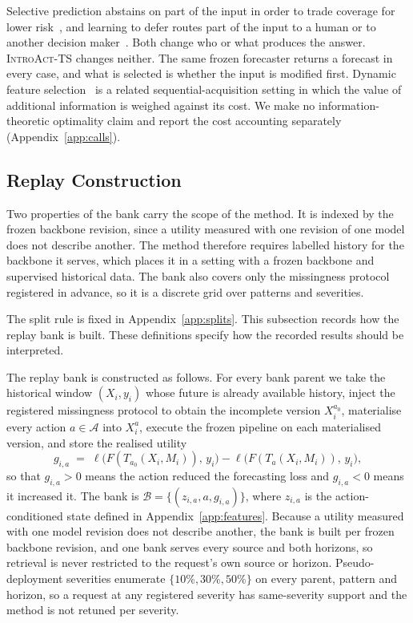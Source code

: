 \documentclass{article}
\newcommand{\introact}{\textsc{IntroAct-TS}}
\newcommand{\calA}{\mathcal{A}}
\newcommand{\calB}{\mathcal{B}}
\newcommand{\loss}{\ell}
\begin{document}
Selective prediction abstains on part of the input in order to trade coverage for lower
risk~\citep{chow1970optimum,vovk2005algorithmic,geifman2017selective,lei2018distribution}, and
learning to defer routes part of the input to a human or to another decision
maker~\citep{madras2018predict,mozannar2020consistent}. Both change who or what produces the
answer. \introact{} changes neither. The same frozen forecaster returns a forecast in every
case, and what is selected is whether the input is modified first. Dynamic feature
selection~\citep{he2024dime} is a related sequential-acquisition setting in which the value of
additional information is weighed against its cost. We make no information-theoretic
optimality claim and report the cost accounting separately (Appendix~\ref{app:calls}).

\subsection{Replay Construction}
\label{app:replay}
Two properties of the bank carry the scope of the method. It is indexed by the frozen backbone
revision, since a utility measured with one revision of one model does not describe another.
The method therefore requires labelled history for the backbone it serves, which places it in
a setting with a frozen backbone and supervised historical data. The bank also
covers only the missingness protocol registered in advance, so it is a discrete grid over
patterns and severities.

The split rule is fixed in Appendix~\ref{app:splits}. This subsection records how the replay bank is built. These definitions specify how the recorded results should be interpreted.

The replay bank is constructed as follows. For every bank parent we take the historical
window $(X_i, y_i)$ whose future is already available history, inject the registered
missingness protocol to obtain the incomplete version $X_i^{a_0}$, materialise every action
$a \in \calA$ into $X_i^{a}$, execute the frozen pipeline on each materialised version, and
store the realised utility
\begin{equation}
  g_{i,a} \;=\; \loss\big(F(T_{a_0}(X_i, M_i)),\, y_i\big) - \loss\big(F(T_{a}(X_i, M_i)),\, y_i\big),
  \label{eq:app-gain}
\end{equation}
so that $g_{i,a} > 0$ means the action reduced the forecasting loss and $g_{i,a} < 0$ means it
increased it. The bank is
$\calB = \{(z_{i,a}, a, g_{i,a})\}$, where $z_{i,a}$ is the action-conditioned state defined
in Appendix~\ref{app:features}. Because a utility measured with one model revision does not describe another, the bank is
built per frozen backbone revision, and one bank serves every source and both horizons, so
retrieval is never restricted to the request's own source or horizon. Pseudo-deployment
severities enumerate
$\{10\%, 30\%, 50\%\}$ on every parent, pattern and horizon, so a request at any registered
severity has same-severity support and the method is not retuned per severity.
\end{document}
